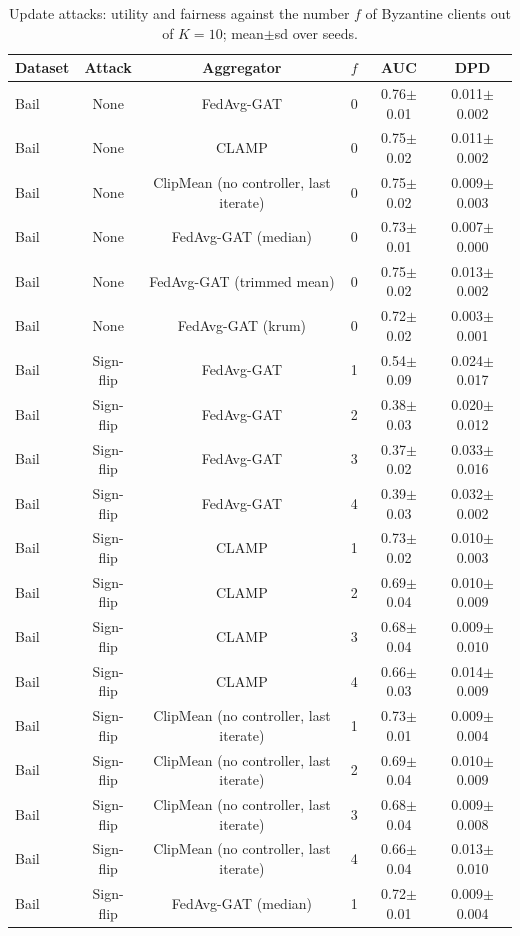 \begin{table}[tbp]
\centering
\small
\caption{Update attacks: utility and fairness against the number $f$ of Byzantine clients out of $K=10$; mean$\pm$sd over seeds.}
\label{tab:e3_attacks}
\begin{tabular}{lccccc}
\toprule
Dataset & Attack & Aggregator & $f$ & AUC & DPD \\
\midrule
Bail & None & FedAvg-GAT & 0 & 0.76$\pm$0.01 & 0.011$\pm$0.002 \\
Bail & None & CLAMP & 0 & 0.75$\pm$0.02 & 0.011$\pm$0.002 \\
Bail & None & ClipMean (no controller, last iterate) & 0 & 0.75$\pm$0.02 & 0.009$\pm$0.003 \\
Bail & None & FedAvg-GAT (median) & 0 & 0.73$\pm$0.01 & 0.007$\pm$0.000 \\
Bail & None & FedAvg-GAT (trimmed mean) & 0 & 0.75$\pm$0.02 & 0.013$\pm$0.002 \\
Bail & None & FedAvg-GAT (krum) & 0 & 0.72$\pm$0.02 & 0.003$\pm$0.001 \\
Bail & Sign-flip & FedAvg-GAT & 1 & 0.54$\pm$0.09 & 0.024$\pm$0.017 \\
Bail & Sign-flip & FedAvg-GAT & 2 & 0.38$\pm$0.03 & 0.020$\pm$0.012 \\
Bail & Sign-flip & FedAvg-GAT & 3 & 0.37$\pm$0.02 & 0.033$\pm$0.016 \\
Bail & Sign-flip & FedAvg-GAT & 4 & 0.39$\pm$0.03 & 0.032$\pm$0.002 \\
Bail & Sign-flip & CLAMP & 1 & 0.73$\pm$0.02 & 0.010$\pm$0.003 \\
Bail & Sign-flip & CLAMP & 2 & 0.69$\pm$0.04 & 0.010$\pm$0.009 \\
Bail & Sign-flip & CLAMP & 3 & 0.68$\pm$0.04 & 0.009$\pm$0.010 \\
Bail & Sign-flip & CLAMP & 4 & 0.66$\pm$0.03 & 0.014$\pm$0.009 \\
Bail & Sign-flip & ClipMean (no controller, last iterate) & 1 & 0.73$\pm$0.01 & 0.009$\pm$0.004 \\
Bail & Sign-flip & ClipMean (no controller, last iterate) & 2 & 0.69$\pm$0.04 & 0.010$\pm$0.009 \\
Bail & Sign-flip & ClipMean (no controller, last iterate) & 3 & 0.68$\pm$0.04 & 0.009$\pm$0.008 \\
Bail & Sign-flip & ClipMean (no controller, last iterate) & 4 & 0.66$\pm$0.04 & 0.013$\pm$0.010 \\
Bail & Sign-flip & FedAvg-GAT (median) & 1 & 0.72$\pm$0.01 & 0.009$\pm$0.004 \\

\end{tabular}
\end{table}
